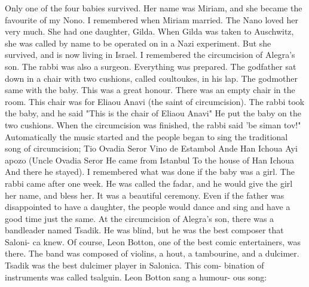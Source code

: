Only one of the four babies survived.
Her name was Miriam, and she became the favourite of my Nono.
I remembered when Miriam married.
The 
Nano loved her very much.
She had one daughter, Gilda.
When Gilda was 
taken to Auschwitz, she was called by name to be operated on in a Nazi 
experiment.
But she survived, and is now living in Israel.
I remembered the circumcision of Alegra's son.
The rabbi was also
a surgeon.
Everything was prepared.
The godfather sat down in a chair 
with two cushions, called coultoukes, in his lap.
The godmother same 
with the baby.
This was a great honour.
There was an empty chair in 
the room.
This chair was for Eliaou Anavi (the saint of circumcision).
The rabbi took the baby, and he said "This is the chair of Eliaou Anavi" 
He put the baby on the two cushions.
When the circumcision was finished, the rabbi said 'be siman tov!"
Automatically the music started and
the people began to sing the traditional song of circumcision; 
Tio Ovadia Seror 
Vino de Estambol 
Ande Han Ichoua 
Ayi apozo 
(Uncle Ovadia Seror 
He came from Istanbul 
To the house of Han Ichoua 
And there he stayed).
I remembered what was done if the baby was a girl.
The rabbi came 
after one week.
He was called the fadar, and he would give the girl her 
name, and bless her.
It was a beautiful ceremony.
Even if the father  
was disappointed to have a daughter, the people would dance and sing and 
have a good time just the same.
At the circumcision of Alegra's son, there was a bandleader 
named Tsadik.
He was blind, but he was the best composer that Saloni-
ca knew.
Of course, Leon Botton, one of the best comic entertainers, 
was there.
The band was composed of violins, a hout, a tambourine, and 
a dulcimer.
Tsadik was the best dulcimer player in Salonica.
This com-
bination of instruments was called tsalguin.
Leon Botton sang a humour-
ous song: 

